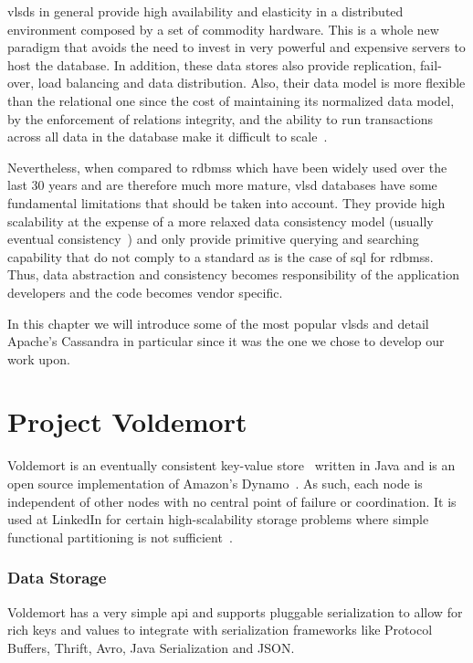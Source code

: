 \acp{vlsd} in general provide high availability and elasticity in a distributed environment composed by a set of commodity hardware. This is a whole new paradigm that avoids the need to invest in very powerful and expensive servers to host the database. In addition, these data stores also provide replication, fail-over, load balancing and data distribution. Also, their data model is more flexible than the relational one since the cost of maintaining its normalized data model, by the enforcement of relations integrity, and the ability to run
transactions across all data in the database make it difficult to scale~\cite{Vilaca:2010:ETL:1926129.1926137}. 

Nevertheless, when compared to \acp{rdbms} which have been widely used over the last 30 years and are therefore much more mature, \ac{vlsd} databases have some fundamental limitations that should be taken into account. They provide high scalability at the expense of a more relaxed data consistency model (usually eventual consistency~\cite{Vogels2008}) and only provide primitive querying and searching capability that do not comply to a standard as is the case of \ac{sql} for \acp{rdbms}. Thus, data abstraction and consistency becomes responsibility of the application developers and the code becomes vendor specific.

In this chapter we will introduce some of the most popular \acp{vlsd} and detail Apache's Cassandra in particular since it was the one we chose to develop our work upon.

\section{Project Voldemort}
Voldemort is an eventually consistent key-value store~\cite{nosqlOrg} written in Java and is an open source implementation of Amazon's Dynamo~\cite{Hastorun2007}. As such, each node is independent of other nodes with no central point of failure or coordination. It is used  at LinkedIn for certain high-scalability storage problems where simple functional partitioning is not sufficient~\cite{voldemort}.

\subsubsection{Data Storage}

Voldemort has a very simple \ac{api} and supports pluggable serialization to allow for rich keys and values to integrate with serialization frameworks like Protocol Buffers, Thrift, Avro, Java Serialization and JSON. 

